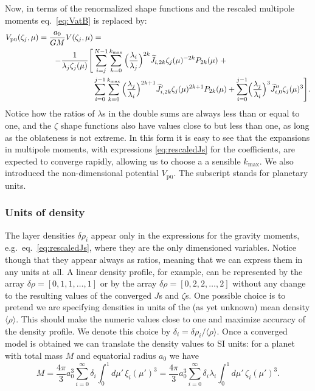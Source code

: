 \documentclass[amsmath,amsfonts,rmp,letterpaper]{revtex4}
\newcommand{\sub}[1]{_{\text{#1}}} %
\newcommand{\mean}[1]{\langle #1 \rangle} %
\renewcommand{\inf}{\infty}
\newcommand{\ptk}{P_{2k}}
\newcommand{\dro}{\delta\rho}
\newcommand{\mupint}{\int_{0}^{1}d\mu'\,}
\newcommand{\kmax}{k\sub{max}}
\newcommand{\Jtil}{\widetilde{J}}
\newcommand{\sumkmax}{\sum_{k=0}^{\kmax}}
\begin{document}
Now, in terms of the renormalized shape functions and the rescaled multipole
moments eq.~\eqref{eq:VatB} is replaced by:
\begin{equation}\label{eq:VpuatB}
\begin{split}
V\sub{pu}(\zeta_j,\mu) = \frac{a_0}{GM} V(\zeta_j,\mu) &= \\ 
-\frac{1}{\lambda_j\zeta_j(\mu)}\Biggl[
&\sum_{i=j}^{N-1}\sumkmax{}\Bigl(\frac{\lambda_i}{\lambda_j}\Bigr)^{2k}
\Jtil_{i,2k}\zeta_j(\mu)^{-2k}\ptk(\mu)\; + \\
&\sum_{i=0}^{j-1}\sumkmax{}\Bigl(\frac{\lambda_j}{\lambda_i}\Bigr)^{2k+1}
\Jtil'_{i,2k}\zeta_j(\mu)^{2k+1}\ptk(\mu) + 
\sum_{i=0}^{j-1}\Bigl(\frac{\lambda_j}{\lambda_i}\Bigr)^3
\Jtil''_{i,0}\zeta_j(\mu)^3
\Biggr].
\end{split}
\end{equation}
Notice how the ratios of $\lambda$s in the double sums are always less than or
equal to one, and the $\zeta$ shape functions also have values close to but less
than one, as long as the oblateness is not extreme. In this form it is easy to see
that the expansions in multipole moments, with expressions \eqref{eq:rescaledJs}
for the coefficients, are expected to converge rapidly, allowing us to choose a a
sensible $\kmax$. We also introduced the non-dimensional potential $V\sub{pu}$.
The subscript stands for planetary units.

\subsubsection{Units of density}

The layer densities $\dro_i$ appear only in the expressions for the gravity
moments, e.g.~eq.~\eqref{eq:rescaledJs}, where they are the only dimensioned
variables. Notice though that they appear always as ratios, meaning that we can
express them in any units at all. A linear density profile, for example, can be
represented by the array $\dro=[0,1,1,\ldots,1]$ or by the array
$\dro=[0,2,2,\ldots,2]$ without any change to the resulting values of the
converged $J$s and $\zeta$s. One possible choice is to pretend we are specifying
densities in units of the (as yet unknown) mean density $\mean{\rho}$. This should
make the numeric values close to one and maximize accuracy of the density profile.
We denote this choice by $\delta_i=\dro_i/\mean{\rho}$. Once a converged model is
obtained we can translate the density values to SI units: for a planet with total
mass $M$ and equatorial radius $a_0$ we have
\begin{equation}
M =
\frac{4\pi}{3}a_0^3\sum_{i=0}^{\inf}\delta_i\mupint\xi_i(\mu')^3 = 
\frac{4\pi}{3}a_0^3\sum_{i=0}^{\inf}\delta_i\lambda_i\mupint\zeta_i(\mu')^3.
\end{equation}
\end{document}

